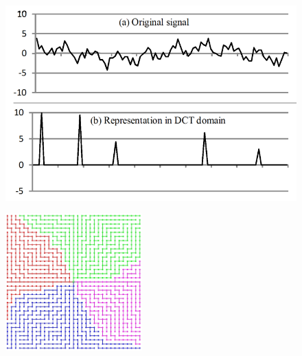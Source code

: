 \begin{figure}
\centering
\begin{minipage}{.5\textwidth}
  \centering
  \includegraphics[width=\linewidth]{images/example-signal-sparse.png}
  \label{fig:sparsesignal}
\end{minipage}%
\begin{minipage}{.5\textwidth}
  \centering
  \includegraphics[width=\linewidth, height=5.3cm]{images/grid-topology-luo.png}
  \label{fig:grid topology}
\end{minipage}
\end{figure}


